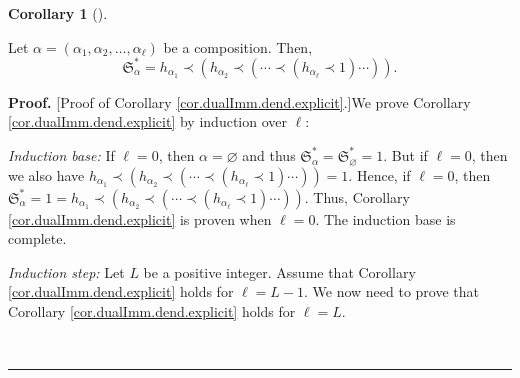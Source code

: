 \documentclass[numbers=enddot,12pt,final,onecolumn,notitlepage,abstracton]{scrartcl}%
\theoremstyle{definition}
\newtheorem{coro}[theo]{Corollary}
\newenvironment{corollary}[1][]
{\begin{coro}[#1]\begin{leftbar}}
{\end{leftbar}\end{coro}}
\newenvironment{proof}[1][Proof]{\noindent\textbf{#1.} }{\ \rule{0.5em}{0.5em}}
\newenvironment{verlong}{}{}
\begin{document}
\begin{corollary}
\label{cor.dualImm.dend.explicit}Let $\alpha=\left(  \alpha_{1},\alpha
_{2},\ldots,\alpha_{\ell}\right)  $ be a composition. Then,%
\[
\mathfrak{S}_{\alpha}^{\ast}=h_{\alpha_{1}}\left.  \prec\right.  \left(
h_{\alpha_{2}}\left.  \prec\right.  \left(  \cdots\left.  \prec\right.
\left(  h_{\alpha_{\ell}}\left.  \prec\right.  1\right)  \cdots\right)
\right)  .
\]

\end{corollary}

\begin{verlong}
\begin{proof}
[Proof of Corollary \ref{cor.dualImm.dend.explicit}.]We prove Corollary
\ref{cor.dualImm.dend.explicit} by induction over $\ell$:

\textit{Induction base:} If $\ell=0$, then $\alpha=\varnothing$ and thus
$\mathfrak{S}_{\alpha}^{\ast}=\mathfrak{S}_{\varnothing}^{\ast}=1$. But if
$\ell=0$, then we also have $h_{\alpha_{1}}\left.  \prec\right.  \left(
h_{\alpha_{2}}\left.  \prec\right.  \left(  \cdots\left.  \prec\right.
\left(  h_{\alpha_{\ell}}\left.  \prec\right.  1\right)  \cdots\right)
\right)  =1$. Hence, if $\ell=0$, then $\mathfrak{S}_{\alpha}^{\ast
}=1=h_{\alpha_{1}}\left.  \prec\right.  \left(  h_{\alpha_{2}}\left.
\prec\right.  \left(  \cdots\left.  \prec\right.  \left(  h_{\alpha_{\ell}%
}\left.  \prec\right.  1\right)  \cdots\right)  \right)  $. Thus, Corollary
\ref{cor.dualImm.dend.explicit} is proven when $\ell=0$. The induction base is complete.

\textit{Induction step:} Let $L$ be a positive integer. Assume that Corollary
\ref{cor.dualImm.dend.explicit} holds for $\ell=L-1$. We now need to prove
that Corollary \ref{cor.dualImm.dend.explicit} holds for $\ell=L$.


\end{proof}
\end{verlong}
\end{document}
